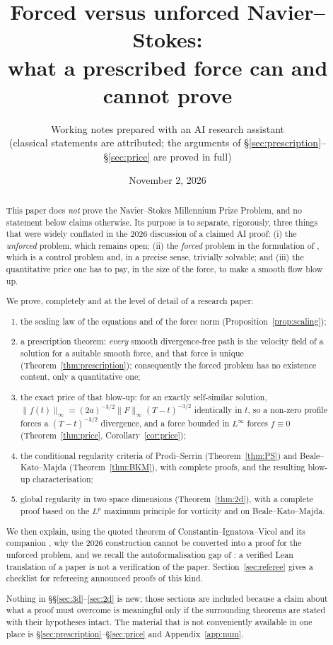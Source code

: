 \documentclass[11pt]{article}
\title{Forced versus unforced Navier--Stokes:\\[2pt]
\large what a prescribed force can and cannot prove}
\author{Working notes prepared with an AI research assistant\\
\small (classical statements are attributed; the arguments of
\S\ref{sec:prescription}--\S\ref{sec:price} are proved in full)}
\date{November 2, 2026}
\theoremstyle{remark}
\newcommand{\norm}[1]{\lVert #1\rVert}
\begin{document}
\maketitle

\begin{abstract}
This paper does \emph{not} prove the Navier--Stokes Millennium Prize Problem, and no
statement below claims otherwise. Its purpose is to separate, rigorously, three things that
were widely conflated in the 2026 discussion of a claimed AI proof: (i) the \emph{unforced}
problem, which remains open; (ii) the \emph{forced} problem in the formulation of
\cite{Fefferman2000}, which is a control problem and, in a precise sense, trivially solvable;
and (iii) the quantitative price one has to pay, in the size of the force, to make a smooth
flow blow up.

We prove, completely and at the level of detail of a research paper:
\begin{enumerate}[label=(\Alph*),leftmargin=*]
\item the scaling law of the equations and of the force norm (Proposition~\ref{prop:scaling});
\item a prescription theorem: \emph{every} smooth divergence-free path is the velocity field of
      a solution for a suitable smooth force, and that force is unique
      (Theorem~\ref{thm:prescription}); consequently the forced problem has no existence
      content, only a quantitative one;
\item the exact price of that blow-up: for an exactly self-similar solution,
      $\norm{f(t)}_{\infty}=(2a)^{-3/2}\norm{F}_{\infty}(T-t)^{-3/2}$ identically in $t$, so a
      non-zero profile forces a $(T-t)^{-3/2}$ divergence, and a force bounded in
      $L^\infty$ forces $f\equiv0$ (Theorem~\ref{thm:price}, Corollary~\ref{cor:price});
\item the conditional regularity criteria of Prodi--Serrin (Theorem~\ref{thm:PS}) and
      Beale--Kato--Majda (Theorem~\ref{thm:BKM}), with complete proofs, and the resulting
      blow-up characterisation;
\item global regularity in two space dimensions (Theorem~\ref{thm:2d}), with a complete proof
      based on the $L^p$ maximum principle for vorticity and on Beale--Kato--Majda.
\end{enumerate}
We then explain, using the quoted theorem of Constantin--Ignatova--Vicol \cite{CIV2026} and its
companion \cite{IKX2026}, why the 2026 construction cannot be converted into a proof for the
unforced problem, and we recall the autoformalisation gap of \cite{BCH2026}: a verified Lean
translation of a paper is not a verification of the paper. Section~\ref{sec:referee} gives a
checklist for refereeing announced proofs of this kind.

Nothing in \S\S\ref{sec:3d}--\ref{sec:2d} is new; those sections are included because a claim
about what a proof must overcome is meaningful only if the surrounding theorems are stated
with their hypotheses intact. The material that is not conveniently available in one place is
\S\ref{sec:prescription}--\S\ref{sec:price} and Appendix~\ref{app:num}.
\end{abstract}
\end{document}
